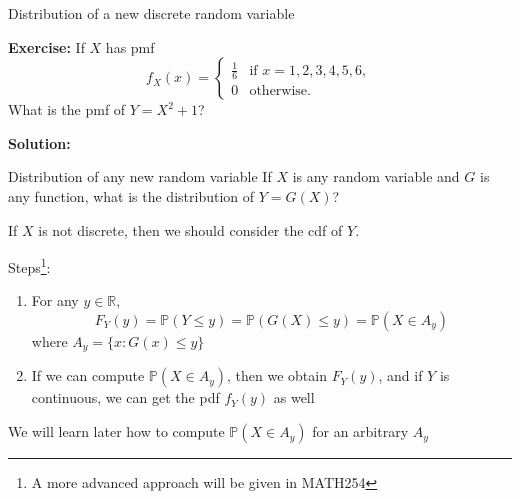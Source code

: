 \documentclass{beamer}
\begin{document}
\begin{frame}{Distribution of a new discrete random variable}

{\bf Exercise:} If $X$ has pmf 
$$f_X(x)=
\begin{cases}
\frac{1}{6} & \text{if }x=1,2,3,4,5,6,\\
0 & \text{otherwise.}
\end{cases}$$
What is the pmf of $Y=X^2+1$? 



{\bf Solution:} 

 


\end{frame}


\begin{frame}{Distribution of any new random variable}
If $X$ is any random variable and $G$ is any function, what is the distribution of  $Y=G(X)$?

If $X$ is not discrete, then we should consider the cdf of $Y$. 



Steps\footnote{A more advanced approach will be given in MATH254}:
\begin{enumerate}
\item For any $y\in\mathbb R$, 
$$F_Y(y)=\mathbb P(Y\leq y)=\mathbb P(G(X)\leq y)=\mathbb P(X\in A_y)$$
where $A_y=\{x: G(x)\leq y\}$ 
\item If we can compute $\mathbb P(X\in A_y)$, then we obtain $F_Y(y)$, and if $Y$ is continuous, we can get the pdf $f_Y(y)$ as well 
\end{enumerate}
We will learn later how to compute $\mathbb P(X\in A_y)$ for an arbitrary $A_y$
\end{frame}
\end{document}
